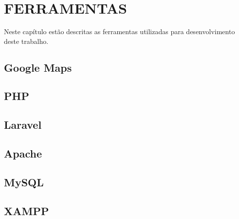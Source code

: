 
\chapter{FERRAMENTAS}
Neste capítulo estão descritas as ferramentas utilizadas para desenvolvimento deste
trabalho.

\section{Google Maps}

\section{PHP}

\section{Laravel}

\section{Apache}

\section{MySQL}

\section{XAMPP}


